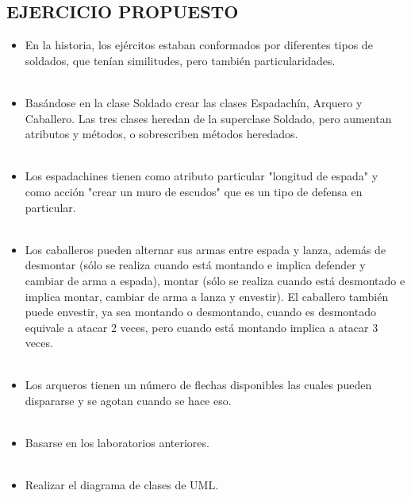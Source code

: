\documentclass{article}
\begin{document}
\begin{itemize}
    \section{EJERCICIO PROPUESTO}
	\begin{itemize}
        \textcolor{red}{PROBLEMA 01}
        \\
        \\
        \item En la historia, los ejércitos estaban conformados por diferentes tipos de soldados, que tenían similitudes, pero también particularidades.
        \\
        \\
        \item Basándose en la clase Soldado crear las clases Espadachín, Arquero y Caballero. Las tres clases heredan de la superclase Soldado, pero aumentan atributos y métodos, o sobrescriben métodos heredados.
        \\
        \\
        \item Los espadachines tienen como atributo particular "longitud de espada" y como acción "crear un muro de escudos" que es un tipo de defensa en particular.
        \\
        \\
        \item Los caballeros pueden alternar sus armas entre espada y lanza, además de desmontar (sólo se realiza cuando está montando e implica defender y cambiar de arma a espada), montar (sólo se realiza cuando está desmontado e implica montar, cambiar de arma a lanza y envestir). El caballero también puede envestir, ya sea montando o desmontando, cuando es desmontado equivale a atacar 2 veces, pero cuando está montando implica a atacar 3 veces.
        \\
        \\
        \item Los arqueros tienen un número de flechas disponibles las cuales pueden dispararse y se agotan cuando se hace eso.
        \\
        \\
        \item Basarse en los laboratorios anteriores.
        \\
        \\
        \item Realizar el diagrama de clases de UML.
        \\
        \\

\end{itemize}
\end{itemize}
\end{document}
